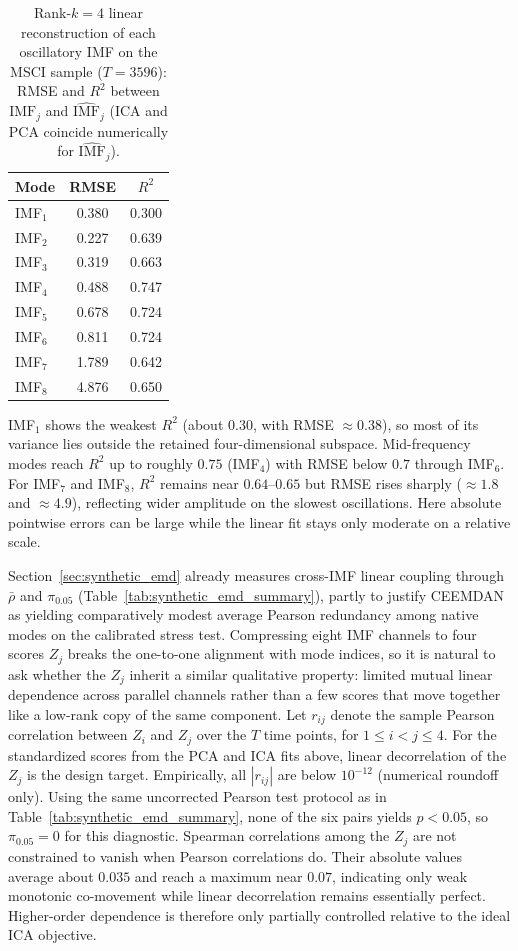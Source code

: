 \documentclass[11pt,a4paper]{article}
\begin{document}
\begin{table}[h]
\centering
\caption{Rank-$k=4$ linear reconstruction of each oscillatory IMF on the MSCI sample ($T=3596$): RMSE and $R^2$ between $\mathrm{IMF}_j$ and $\widehat{\mathrm{IMF}}_j$ (ICA and PCA coincide numerically for $\widehat{\mathrm{IMF}}_j$).}
\label{tab:imf_red_recon_k4}
\small
\begin{tabular}{lcc}
\toprule
\textbf{Mode} & \textbf{RMSE} & \textbf{$R^2$} \\
\midrule
IMF$_1$ & 0.380 & 0.300 \\
IMF$_2$ & 0.227 & 0.639 \\
IMF$_3$ & 0.319 & 0.663 \\
IMF$_4$ & 0.488 & 0.747 \\
IMF$_5$ & 0.678 & 0.724 \\
IMF$_6$ & 0.811 & 0.724 \\
IMF$_7$ & 1.789 & 0.642 \\
IMF$_8$ & 4.876 & 0.650 \\
\bottomrule
\end{tabular}
\end{table}

IMF$_1$ shows the weakest $R^2$ (about $0.30$, with RMSE $\approx 0.38$), so most of its variance lies outside the retained four-dimensional subspace. Mid-frequency modes reach $R^2$ up to roughly $0.75$ (IMF$_4$) with RMSE below $0.7$ through IMF$_6$. For IMF$_7$ and IMF$_8$, $R^2$ remains near $0.64$--$0.65$ but RMSE rises sharply ($\approx 1.8$ and $\approx 4.9$), reflecting wider amplitude on the slowest oscillations. Here absolute pointwise errors can be large while the linear fit stays only moderate on a relative scale.

Section~\ref{sec:synthetic_emd} already measures cross-IMF linear coupling through $\bar{\rho}$ and $\pi_{0.05}$ (Table~\ref{tab:synthetic_emd_summary}), partly to justify CEEMDAN as yielding comparatively modest average Pearson redundancy among native modes on the calibrated stress test. Compressing eight IMF channels to four scores $Z_j$ breaks the one-to-one alignment with mode indices, so it is natural to ask whether the $Z_j$ inherit a similar qualitative property: limited mutual linear dependence across parallel channels rather than a few scores that move together like a low-rank copy of the same component. Let $r_{ij}$ denote the sample Pearson correlation between $Z_i$ and $Z_j$ over the $T$ time points, for $1\le i<j\le 4$. For the standardized scores from the PCA and ICA fits above, linear decorrelation of the $Z_j$ is the design target. Empirically, all $|r_{ij}|$ are below $10^{-12}$ (numerical roundoff only). Using the same uncorrected Pearson test protocol as in Table~\ref{tab:synthetic_emd_summary}, none of the six pairs yields $p<0.05$, so $\pi_{0.05}=0$ for this diagnostic. Spearman correlations among the $Z_j$ are not constrained to vanish when Pearson correlations do. Their absolute values average about $0.035$ and reach a maximum near $0.07$, indicating only weak monotonic co-movement while linear decorrelation remains essentially perfect. Higher-order dependence is therefore only partially controlled relative to the ideal ICA objective.
\end{document}
